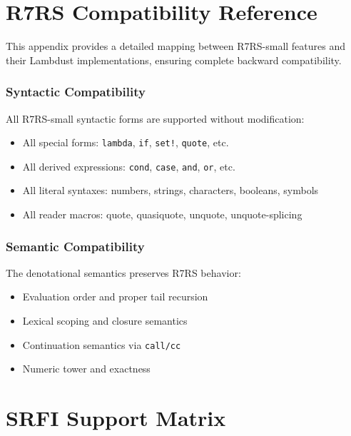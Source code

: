 \documentclass[twoside,twocolumn]{algol60}
\begin{document}


\newpage
\onecolumn


\twocolumn
\appendix

\chapter{R7RS Compatibility Reference}
\label{app:r7rs-compat}

This appendix provides a detailed mapping between R7RS-small features and their Lambdust implementations, ensuring complete backward compatibility.

\subsection{Syntactic Compatibility}
\label{app:syntax-compat}

All R7RS-small syntactic forms are supported without modification:
\begin{itemize}
\item All special forms: \texttt{lambda}, \texttt{if}, \texttt{set!}, \texttt{quote}, etc.
\item All derived expressions: \texttt{cond}, \texttt{case}, \texttt{and}, \texttt{or}, etc.
\item All literal syntaxes: numbers, strings, characters, booleans, symbols
\item All reader macros: quote, quasiquote, unquote, unquote-splicing
\end{itemize}

\subsection{Semantic Compatibility}
\label{app:semantic-compat}

The denotational semantics preserves R7RS behavior:
\begin{itemize}
\item Evaluation order and proper tail recursion
\item Lexical scoping and closure semantics
\item Continuation semantics via \texttt{call/cc}
\item Numeric tower and exactness
\end{itemize}

\chapter{SRFI Support Matrix}
\label{app:srfi-matrix}
\end{document}
